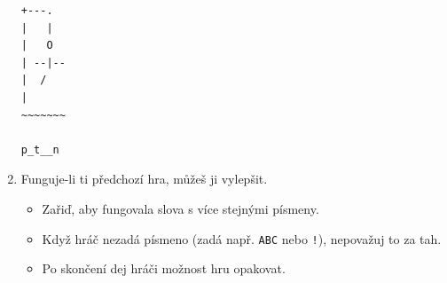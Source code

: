 \documentclass[a4paper,10pt]{article}
\begin{document}
\begin{enumerate}[resume]
\begin{verbatim}
+---.
|   |
|   O
| --|--
|  /
|
~~~~~~~

p_t__n

\end{verbatim}

\item Funguje-li ti předchozí hra, můžeš ji vylepšit.

    \begin{itemize}
        \item Zařiď, aby fungovala slova s více stejnými písmeny.
        \item Když hráč nezadá písmeno (zadá např. \texttt{ABC} nebo \texttt{!}),
            nepovažuj to za tah.
        \item Po skončení dej hráči možnost hru opakovat.
    \end{itemize}

\end{enumerate}
\end{document}
